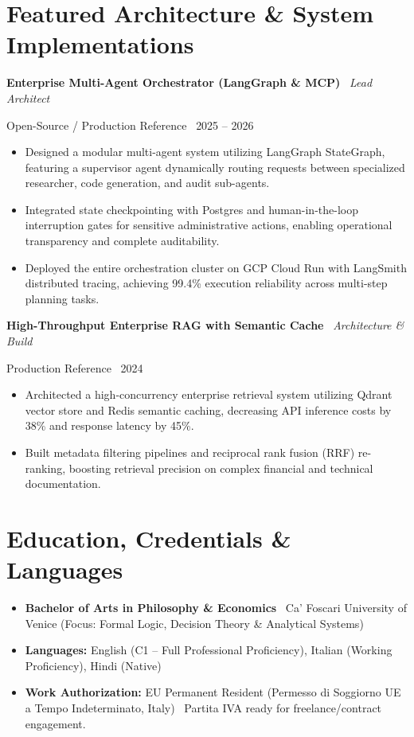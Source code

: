 \documentclass[a4paper,10pt]{article}
\newcommand{\role}[4]{%
  \vspace{2pt}\noindent
  \begin{minipage}[t]{0.70\textwidth}\raggedright\textbf{#1} \textbullet\ \textit{#3}\end{minipage}%
  \hfill
  \begin{minipage}[t]{0.28\textwidth}\raggedleft\footnotesize\color{gray}#2 \textbullet\ #4\end{minipage}%
  \vspace{1pt}%
}
\begin{document}
\section{Featured Architecture \& System Implementations}

\role{Enterprise Multi-Agent Orchestrator (LangGraph \& MCP)}{Open-Source / Production Reference}{Lead Architect}{2025 -- 2026}
\begin{itemize}
  \item Designed a modular multi-agent system utilizing LangGraph StateGraph, featuring a supervisor agent dynamically routing requests between specialized researcher, code generation, and audit sub-agents.
  \item Integrated state checkpointing with Postgres and human-in-the-loop interruption gates for sensitive administrative actions, enabling operational transparency and complete auditability.
  \item Deployed the entire orchestration cluster on GCP Cloud Run with LangSmith distributed tracing, achieving 99.4\% execution reliability across multi-step planning tasks.
\end{itemize}

\role{High-Throughput Enterprise RAG with Semantic Cache}{Production Reference}{Architecture \& Build}{2024}
\begin{itemize}
  \item Architected a high-concurrency enterprise retrieval system utilizing Qdrant vector store and Redis semantic caching, decreasing API inference costs by 38\% and response latency by 45\%.
  \item Built metadata filtering pipelines and reciprocal rank fusion (RRF) re-ranking, boosting retrieval precision on complex financial and technical documentation.
\end{itemize}

\section{Education, Credentials \& Languages}
\begin{itemize}
  \item \textbf{Bachelor of Arts in Philosophy \& Economics} \textbullet\ Ca' Foscari University of Venice (Focus: Formal Logic, Decision Theory \& Analytical Systems)
  \item \textbf{Languages:} English (C1 -- Full Professional Proficiency), Italian (Working Proficiency), Hindi (Native)
  \item \textbf{Work Authorization:} EU Permanent Resident (Permesso di Soggiorno UE a Tempo Indeterminato, Italy) \textbullet\ Partita IVA ready for freelance/contract engagement.
\end{itemize}
\end{document}
